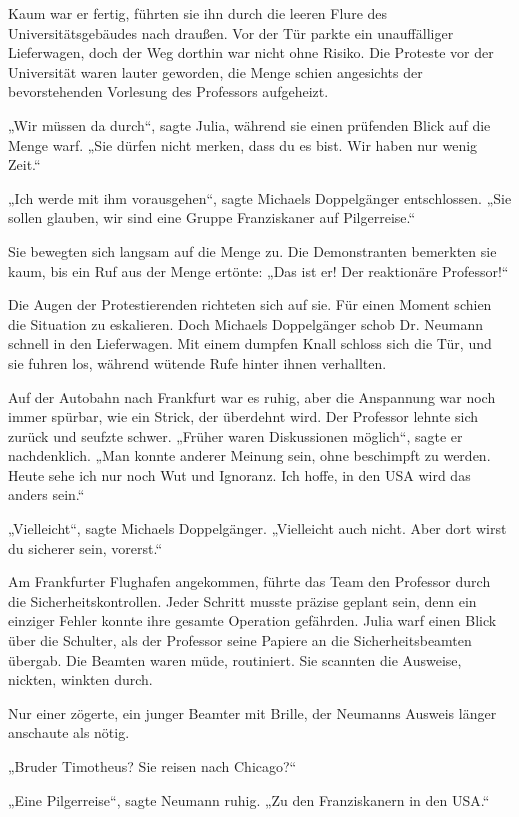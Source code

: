 \documentclass[
]{article}
\begin{document}
Kaum war er fertig, führten sie ihn durch die leeren Flure des Universitätsgebäudes nach draußen. Vor der Tür parkte ein unauffälliger Lieferwagen, doch der Weg dorthin war nicht ohne Risiko. Die Proteste vor der Universität waren lauter geworden, die Menge schien angesichts der bevorstehenden Vorlesung des Professors aufgeheizt.

„Wir müssen da durch``, sagte Julia, während sie einen prüfenden Blick auf die Menge warf. „Sie dürfen nicht merken, dass du es bist. Wir haben nur wenig Zeit.``

„Ich werde mit ihm vorausgehen``, sagte Michaels Doppelgänger entschlossen. „Sie sollen glauben, wir sind eine Gruppe Franziskaner auf Pilgerreise.``

Sie bewegten sich langsam auf die Menge zu. Die Demonstranten bemerkten sie kaum, bis ein Ruf aus der Menge ertönte: „Das ist er! Der reaktionäre Professor!{\kern0pt}``

Die Augen der Protestierenden richteten sich auf sie. Für einen Moment schien die Situation zu eskalieren. Doch Michaels Doppelgänger schob Dr. Neumann schnell in den Lieferwagen. Mit einem dumpfen Knall schloss sich die Tür, und sie fuhren los, während wütende Rufe hinter ihnen verhallten.

Auf der Autobahn nach Frankfurt war es ruhig, aber die Anspannung war noch immer spürbar, wie ein Strick, der überdehnt wird. Der Professor lehnte sich zurück und seufzte schwer. „Früher waren Diskussionen möglich``, sagte er nachdenklich. „Man konnte anderer Meinung sein, ohne beschimpft zu werden. Heute sehe ich nur noch Wut und Ignoranz. Ich hoffe, in den USA wird das anders sein.``

„Vielleicht``, sagte Michaels Doppelgänger. „Vielleicht auch nicht. Aber dort wirst du sicherer sein, vorerst.``

Am Frankfurter Flughafen angekommen, führte das Team den Professor durch die Sicherheitskontrollen. Jeder Schritt musste präzise geplant sein, denn ein einziger Fehler konnte ihre gesamte Operation gefährden. Julia warf einen Blick über die Schulter, als der Professor seine Papiere an die Sicherheitsbeamten übergab. Die Beamten waren müde, routiniert. Sie scannten die Ausweise, nickten, winkten durch.

Nur einer zögerte, ein junger Beamter mit Brille, der Neumanns Ausweis länger anschaute als nötig.

„Bruder Timotheus? Sie reisen nach Chicago?“

„Eine Pilgerreise“, sagte Neumann ruhig. „Zu den Franziskanern in den USA.“
\end{document}

